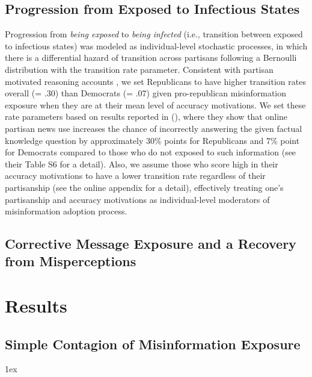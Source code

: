 \documentclass[man, 12pt, a4paper, nolmodern, noextraspace]{apa6}
\begin{document}
\subsection{Progression from Exposed to Infectious States}
    Progression from \emph{being exposed} to \emph{being infected} (i.e., transition between exposed to infectious states) was modeled as individual-level stochastic processes, in which there is a differential hazard of transition across partisans following a Bernoulli distribution with the transition rate parameter. Consistent with partisan motivated reasoning accounts \parencite{taber2006, nyhan2010corrections}, we set Republicans to have higher transition rates overall (= .30) than Democrats (= .07) given pro-republican misinformation exposure when they are at their mean level of accuracy motivations. We set these rate parameters based on results reported in \citeauthor{garrett2016driving} (\citeyear{garrett2016driving}), where they show that online partisan news use increases the chance of incorrectly answering the given factual knowledge question by approximately 30\% points for Republicans and 7\% point for Democrats compared to those who do not exposed to such information (see their Table S6 for a detail). Also, we assume those who score high in their accuracy motivations to have a lower transition rate regardless of their partisanship (see the online appendix for a detail), effectively treating one's partisanship and accuracy motivations as individual-level moderators of misinformation adoption process. 

\subsection{Corrective Message Exposure and a Recovery from Misperceptions}


\section{Results}
\subsection{Simple Contagion of Misinformation Exposure}



\printbibliography
\newpage
\begingroup
\parindent 0pt
\parskip 1ex
\def\enotesize{\normalsize}
\theendnotes
\endgroup
\end{document}
